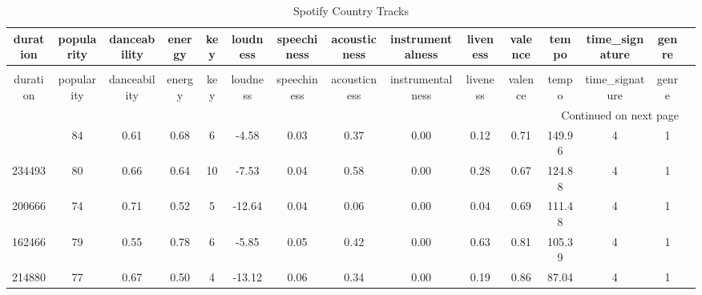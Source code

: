 \begin{longtable}[h!]{c|c|c|c|c|c|c|c|c|c|c|c|c|c|c}
\caption{Spotify Country Tracks} \label{tab:country_tracks_datatable} \\
\toprule
duration & popularity & danceability & energy & key & loudness & speechiness & acousticness & instrumentalness & liveness & valence & tempo & time_signature & genre \\
\midrule
\endfirsthead
\caption[]{Spotify Country Tracks} \\
\toprule
duration & popularity & danceability & energy & key & loudness & speechiness & acousticness & instrumentalness & liveness & valence & tempo & time_signature & genre \\
\midrule
\endhead
\midrule
\multicolumn{14}{r}{Continued on next page} \\
\midrule
\endfoot
\bottomrule
\endlastfoot
234346 & 84 & 0.61 & 0.68 & 6 & -4.58 & 0.03 & 0.37 & 0.00 & 0.12 & 0.71 & 149.96 & 4 & 1 \\
234493 & 80 & 0.66 & 0.64 & 10 & -7.53 & 0.04 & 0.58 & 0.00 & 0.28 & 0.67 & 124.88 & 4 & 1 \\
200666 & 74 & 0.71 & 0.52 & 5 & -12.64 & 0.04 & 0.06 & 0.00 & 0.04 & 0.69 & 111.48 & 4 & 1 \\
162466 & 79 & 0.55 & 0.78 & 6 & -5.85 & 0.05 & 0.42 & 0.00 & 0.63 & 0.81 & 105.39 & 4 & 1 \\
214880 & 77 & 0.67 & 0.50 & 4 & -13.12 & 0.06 & 0.34 & 0.00 & 0.19 & 0.86 & 87.04 & 4 & 1 \\
\end{longtable}
